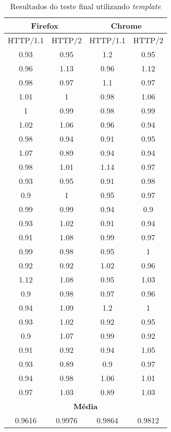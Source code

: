 \begin{table}[h]
	\centering
	\caption{Resultados do teste final utilizando \textit{template}}
	\label{resultados-template}
	\begin{tabular}{cccc}
		\hline
		\multicolumn{2}{c}{\textbf{Firefox}} & \multicolumn{2}{c}{\textbf{Chrome}} \\
		\hline
		HTTP/1.1 & HTTP/2 & HTTP/1.1 & HTTP/2 \\
		\hline
		0.93 & 0.95 & 1.2 & 0.95 \\
		0.96 & 1.13 & 0.96 & 1.12 \\
		0.98 & 0.97 & 1.1 & 0.97 \\
		1.01 & 1 & 0.98 & 1.06 \\
		1   & 0.99 & 0.98 & 0.99 \\
		1.02 & 1.06 & 0.96 & 0.94 \\
		0.98 & 0.94 & 0.91 & 0.95 \\
		1.07 & 0.89 & 0.94 & 0.94 \\
		0.98 & 1.01 & 1.14 & 0.97 \\
		0.93 & 0.95 & 0.91 & 0.98 \\
		0.9 & 1 & 0.95 & 0.97 \\
		0.99 & 0.99 & 0.94 & 0.9  \\
		0.93 & 1.02 & 0.91 & 0.94 \\
		0.91 & 1.08 & 0.99 & 0.97 \\
		0.99 & 0.98 & 0.95 & 1    \\
		0.92 & 0.92 & 1.02 & 0.96 \\
		1.12 & 1.08 & 0.95 & 1.03 \\
		0.9 & 0.98 & 0.97 & 0.96 \\
		0.94 & 1.09 & 1.2 & 1    \\
		0.93 & 1.02 & 0.92 & 0.95 \\
		0.9 & 1.07 & 0.99 & 0.92 \\
		0.91 & 0.92 & 0.94 & 1.05 \\
		0.93 & 0.89 & 0.9 & 0.97 \\
		0.94 & 0.98 & 1.06 & 1.01 \\
		0.97 & 1.03 & 0.89 & 1.03 \\
		\hline
		\multicolumn{4}{c}{\textbf{Média}} \\
		0.9616 & 0.9976 & 0.9864 & 0.9812 \\
		\hline
	\end{tabular}
\end{table}